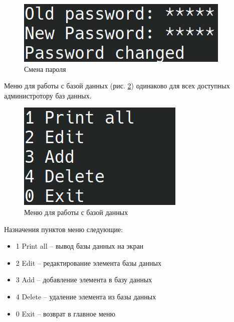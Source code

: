 \begin{figure}[H]
    \centering
    \includegraphics[width=0.7\linewidth]{photo/interface/password_change}
    \caption{Смена пароля}
    \label{password_change}
\end{figure}

Меню для работы с базой данных (рис. \ref{menu_db}) одинаково 
для всех доступных администротору баз данных.

\begin{figure}[H]
    \centering
    \includegraphics[width=0.7\linewidth]{photo/interface/menu_db}
    \caption{Меню для работы с базой данных}
    \label{menu_db}
\end{figure}

Назначения пунктов меню следующие:

\begin{itemize}
    \item 1 Print all -- вывод базы данных на экран
    \item 2 Edit -- редактирование элемента базы данных
    \item 3 Add -- добавление элемента в базу данных
    \item 4 Delete -- удаление элемента из базы данных
    \item 0 Exit -- возврат в главное меню
\end{itemize}